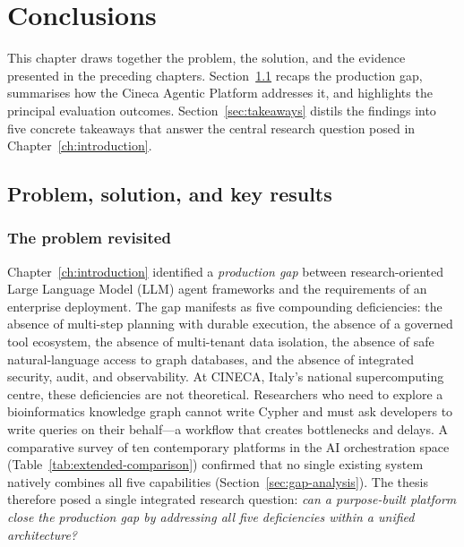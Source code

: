 \documentclass[a4paper]{sapthesis}
\begin{document}

\chapter{Conclusions}
\label{ch:conclusions}

This chapter draws together the problem, the solution, and the evidence
presented in the preceding chapters.  Section~\ref{sec:recap} recaps the
production gap, summarises how the Cineca Agentic Platform addresses it,
and highlights the principal evaluation outcomes.
Section~\ref{sec:takeaways} distils the findings into five concrete
takeaways that answer the central research question posed in
Chapter~\ref{ch:introduction}.

\section{Problem, solution, and key results}
\label{sec:recap}

\subsection{The problem revisited}

Chapter~\ref{ch:introduction} identified a \emph{production gap} between
research-oriented Large Language Model (LLM) agent frameworks and the
requirements of an enterprise deployment.  The gap manifests as five
compounding deficiencies: the absence of multi-step planning with durable
execution, the absence of a governed tool ecosystem, the absence of
multi-tenant data isolation, the absence of safe natural-language access to
graph databases, and the absence of integrated security, audit, and
observability.  At CINECA, Italy's national supercomputing centre, these
deficiencies are not theoretical.  Researchers who need to explore a
bioinformatics knowledge graph cannot write Cypher and must ask developers
to write queries on their behalf---a workflow that creates bottlenecks and
delays.  A comparative survey of ten contemporary platforms in the AI
orchestration space (Table~\ref{tab:extended-comparison}) confirmed that no
single existing system natively combines all five capabilities
(Section~\ref{sec:gap-analysis}).  The thesis therefore posed a single
integrated research question: \emph{can a purpose-built platform close the
production gap by addressing all five deficiencies within a unified
architecture?}
\end{document}
